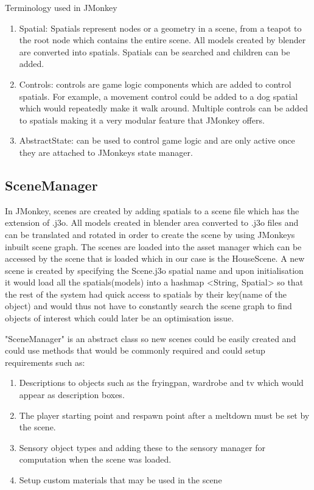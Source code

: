 \documentclass[11pt]{report}
\begin{document}
Terminology used in JMonkey
\begin{enumerate}
\item Spatial: Spatials represent nodes or a geometry in a scene, from a teapot to the root node which contains the entire scene. All models created by blender are converted into spatials. Spatials can be searched and children can be added.
\item Controls: controls are game logic components which are added to control spatials. For example, a movement control could be added to a dog spatial which would repeatedly make it walk around. Multiple controls can be added to spatials making it a very modular feature that JMonkey offers. 
\item AbstractState: can be used to control game logic and are only active once they are attached to JMonkeys state manager.
\end{enumerate}

\subsection{SceneManager}
In JMonkey, scenes are created by adding spatials to a scene file which has the extension of .j3o. All models created in blender area converted to .j3o files and can be translated and rotated in order to create the scene by using JMonkeys inbuilt scene graph. The scenes are loaded into the asset manager which can be accessed by the scene that is loaded which in our case is the HouseScene. A new scene is created by specifying the Scene.j3o spatial name and upon initialisation it would load all the spatials(models) into a hashmap <String, Spatial> so that the rest of the system had quick access to spatials by their key(name of the object) and would thus not have to constantly search the scene graph to find objects of interest which could later be an optimisation issue. 

"SceneManager" is an abstract class so new scenes could be easily created and could use methods that would be commonly required and could setup requirements such as:

\begin{enumerate}
\item Descriptions to objects such as the fryingpan, wardrobe and tv which would appear as description boxes. 
\item The player starting point and respawn point after a meltdown must be set by the scene. 
\item Sensory object types and adding these to the sensory manager for computation when the scene was loaded. 
\item Setup custom materials that may be used in the scene
\end{enumerate}
\end{document}
